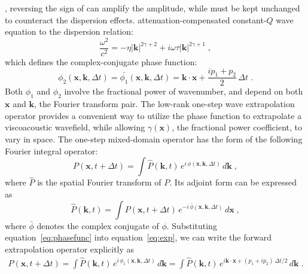 , reversing the sign of  can amplify the amplitude, while  must be kept unchanged to counteract the dispersion effects.  attenuation-compensated constant-$Q$ wave equation  to the dispersion relation:
\begin{equation}
  \label{eq:dispfrac2}
  \frac{\omega^2}{c^2} = -\eta |\mathbf{k}|^{2\gamma +2} + i\omega\tau |\mathbf{k}|^{2\gamma +1} \; ,
\end{equation}
which defines the complex-conjugate phase function:
\begin{equation}
  \label{eq:phasefunc2}
  \phi_2 (\mathbf{x},\mathbf{k},\Delta t) = \bar{\phi_1} (\mathbf{x},\mathbf{k},\Delta t) = \mathbf{k} \cdot \mathbf{x} + \frac{ip_1 + p_2}{2}\,\Delta t \; .
\end{equation}
Both $\phi_1$ and $\phi_2$ involve the fractional power of wavenumber, and depend on both $\mathbf{x}$ and $\mathbf{k}$, the Fourier transform pair. The low-rank one-step wave extrapolation operator \cite[]{myself1} provides a convenient way to utilize the phase function to extrapolate a viscoacoustic wavefield, while allowing $\gamma(\mathbf{x})$, the fractional power coefficient, to vary in space. The one-step mixed-domain operator has the form of the following Fourier integral operator:
\begin{equation}
  \label{eq:exp}
  P(\mathbf{x},t+\Delta t) = \int \hat{P}(\mathbf{k},t)\,e^{i\,\phi(\mathbf{x},\mathbf{k},\Delta t)}\,d\mathbf{k}\;,
\end{equation}
where $\hat{P}$ is the spatial Fourier transform of $P$.
Its adjoint form can be expressed as
\begin{equation}
  \label{eq:expadj}
  \hat{P}(\mathbf{k},t) = \int P(\mathbf{x},t+\Delta t)\,e^{-i\,\bar{\phi}(\mathbf{x},\mathbf{k},\Delta t)}\,d\mathbf{x}\; ,
\end{equation}
where $\bar{\phi}$ denotes the complex conjugate of $\phi$.  Substituting equation~\ref{eq:phasefunc} into equation~\ref{eq:exp}, we can write the forward extrapolation operator explicitly as
\begin{eqnarray}
  \label{eq:expfor}
  P(\mathbf{x},t+\Delta t) = \int \hat{P}(\mathbf{k},t)\,e^{i\,\phi_1(\mathbf{x},\mathbf{k},\Delta t)}\,d\mathbf{k}
  = \int \hat{P}(\mathbf{k},t)\,e^{i\mathbf{k} \cdot \mathbf{x} + (p_1 + ip_2)\,\Delta t/2}\,d\mathbf{k} \; .
\end{eqnarray}
